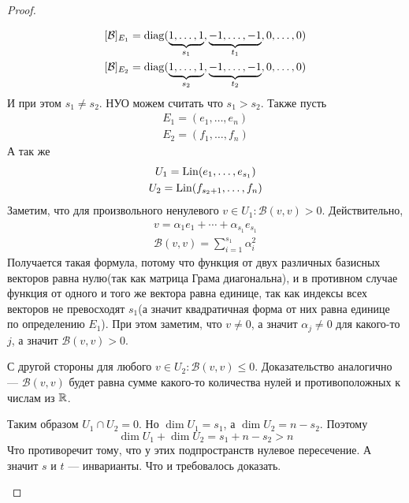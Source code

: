 \documentclass[../main.tex]{subfiles}
\begin{document}
\begin{proof}
\begin{enumerate}
\begin{equation*}
      \begin{gathered}
        [\mathcal{B}]_{E_1} = \diag(
        \underbrace{1, \dotsc, 1}_{s_1},
        \underbrace{-1, \dotsc, -1}_{t_1},
        0, \dotsc, 0) \\
        [\mathcal{B}]_{E_2} = \diag(
          \underbrace{1, \dotsc, 1}_{s_2},
          \underbrace{-1, \dotsc, -1}_{t_2},
          0, \dotsc, 0)
      \end{gathered}
    \end{equation*}
    И при этом $s_1 \neq s_2$. НУО можем считать что $s_1 > s_2$. Также пусть
    \begin{equation*}
      \begin{gathered}
        E_1 = (e_1, \dotsc, e_n) \\
        E_2 = (f_1, \dotsc, f_n)
      \end{gathered}
    \end{equation*}
    А так же
    \begin{equation*}
      \begin{gathered}
        U_1 = \operatorname{Lin}(e_1, \dotsc, e_{s_1}) \\
        U_2 = \operatorname{Lin}(f_{s_2 + 1}, \dotsc, f_n)
      \end{gathered}
    \end{equation*}
    Заметим, что для произвольного ненулевого $v \in U_1\colon \mathcal{B}(v, v) > 0$. Действительно,
    \begin{equation*}
      \begin{gathered}
        v = \alpha_1 e_1 + \dotsb + \alpha_{s_1} e_{s_1} \\
        \mathcal{B}(v, v) = \sum\limits_{i = 1}^{s_1} \alpha_i^2
      \end{gathered}
    \end{equation*}
    Получается такая формула, потому что функция от двух различных базисных векторов равна нулю(так как матрица Грама диагональна), и в противном случае функция от одного и того же вектора равна единице, так как индексы всех векторов не превосходят $s_1$(а значит квадратичная форма от них равна единице по определению $E_1$). При этом заметим, что $v \neq 0$, а значит $\alpha_j \neq 0$ для какого-то $j$, а значит $\mathcal{B}(v, v) > 0$.

    С другой стороны для любого $v \in U_2\colon \mathcal{B}(v, v) \leq 0$. Доказательство аналогично --- $\mathcal{B}(v, v)$ будет равна сумме какого-то количества нулей и противоположных к числам из $\mathbb{R}$.

    Таким образом $U_1 \cap U_2 = 0$. Но $\dim U_1 = s_1$, а $\dim U_2 = n - s_2$. Поэтому
    \begin{equation*}
      \dim U_1 + \dim U_2 = s_1 + n - s_2 > n
    \end{equation*}
    Что противоречит тому, что у этих подпространств нулевое пересечение. А значит $s$ и $t$ --- инварианты. Что и требовалось доказать.
  \end{enumerate}
\end{proof}
\end{document}
